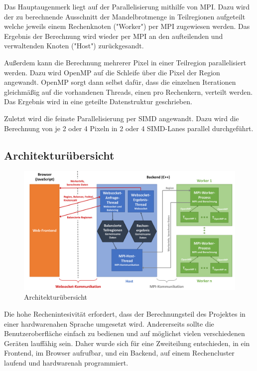 Das Hauptaugenmerk liegt auf der Parallelisierung mithilfe von MPI.
Dazu wird der zu berechnende Ausschnitt der Mandelbrotmenge in Teilregionen aufgeteilt
welche jeweils einem Rechenknoten ("Worker") per MPI zugewiesen werden.
Das Ergebnis der Berechnung wird wieder per MPI an den aufteilenden und verwaltenden Knoten ("Host")
zurückgesandt.

Außerdem kann die Berechnung mehrerer Pixel in einer Teilregion parallelisiert werden.
Dazu wird OpenMP auf die Schleife über die Pixel der Region angewandt.
OpenMP sorgt dann selbst dafür, dass die einzelnen Iterationen gleichmäßig auf die vorhandenen
Threads, einen pro Rechenkern, verteilt werden.
Das Ergebnis wird in eine geteilte Datenstruktur geschrieben.

Zuletzt wird die feinste Parallelisierung per SIMD angewandt.
Dazu wird die Berechnung von je 2 oder 4 Pixeln in 2 oder 4 SIMD-Lanes parallel durchgeführt.

\subsection{Architekturübersicht}\label{sec:architektur}
\begin{figure}
	\centering
	\includegraphics[width=\linewidth]{img/Implementierung/ArchitekturAusfuehrlich.pdf}
	\caption{Architekturübersicht}
	\label{fig:architekturuebersicht_detail}
\end{figure}

Die hohe Rechenintesivität erfordert, dass der Berechnungsteil des Projektes in einer
hardwarenahen Sprache umgesetzt wird.
Andererseits sollte die Benutzeroberfläche einfach zu bedienen und auf möglichst vielen verschiedenen Geräten lauffähig sein.
Daher wurde sich für eine Zweiteilung entschieden, in ein Frontend, im Browser aufrufbar, und ein Backend, auf einem Rechencluster
laufend und hardwarenah programmiert.

